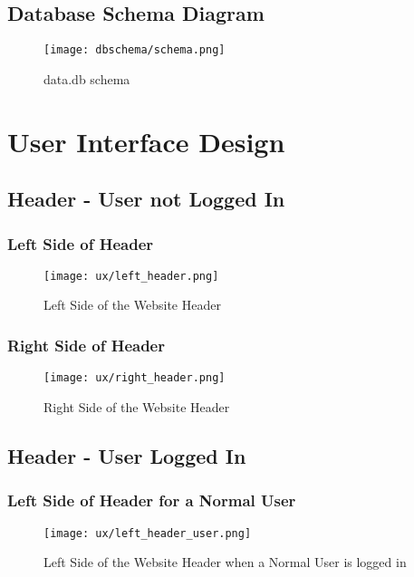 \subsection{Database Schema Diagram}

\begin{figure}[H]
\hspace{-2cm} 
\texttt{[image: dbschema/schema.png]}
\caption{data.db schema}
\label{database_schema}
\end{figure}

\section{User Interface Design}

\subsection{Header - User not Logged In}

\subsubsection{Left Side of Header}
\begin{figure}[H]
\begin{center}
\texttt{[image: ux/left\_header.png]}
\end{center} 
\caption{Left Side of the Website Header}
\label{ux_left_header}
\end{figure}

\subsubsection{Right Side of Header}
\begin{figure}[H]
\begin{center}
\texttt{[image: ux/right\_header.png]}
\end{center} 
\caption{Right Side of the Website Header}
\label{ux_right_header}
\end{figure}

\subsection{Header - User Logged In}

\subsubsection{Left Side of Header for a Normal User}
\begin{figure}[H]
\begin{center}
\texttt{[image: ux/left\_header\_user.png]}
\end{center} 
\caption{Left Side of the Website Header when a Normal User is logged in}
\label{ux_left_header_user}
\end{figure}

